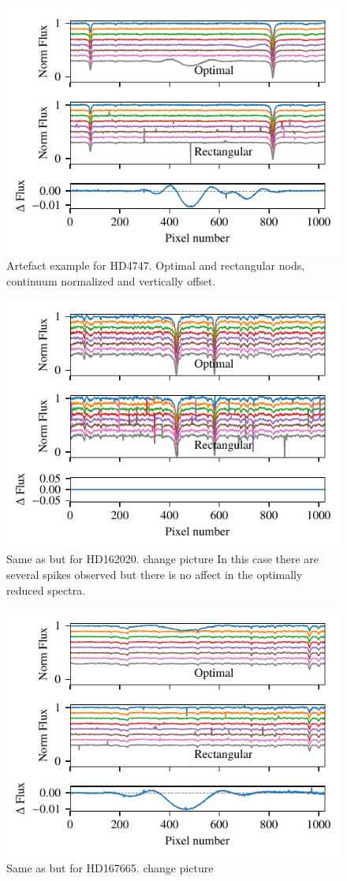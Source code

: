  \begin{figure}
     \centering
     \includegraphics[width=0.7\linewidth]{figures/appendix/bp_plots/extraction_comparision_HD4747-1_chip_2}
     \caption{Artefact example for HD4747. Optimal and rectangular nods, continuum normalized and vertically offset.}
     \label{fig:artefact_example1}
 \end{figure}
 \begin{figure}
     \centering
     \includegraphics[width=0.7\linewidth]{figures/appendix/bp_plots/extraction_comparision_HD162020-2_chip_1}
     \caption{Same as  but for HD162020. {\red{} change picture} In this case there are several spikes observed but there is no affect in the optimally reduced spectra.}
     \label{fig:artefact_example2}
 \end{figure}
 \begin{figure}
     \centering
     \includegraphics[width=0.7\linewidth]{figures/appendix/bp_plots/extraction_comparision_HD167665-1b_chip_3}
     \caption{Same as  but for HD167665. {\red{} change picture}}
     \label{fig:artefact_example3}
 \end{figure}
